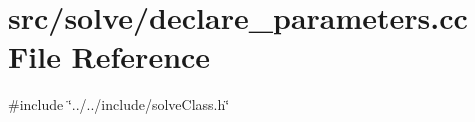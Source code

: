 \section{src/solve/declare\+\_\+parameters.cc File Reference}
\label{solve_2declare__parameters_8cc}
{\ttfamily \#include \char`\"{}../../include/solve\+Class.\+h\char`\"{}}\newline
